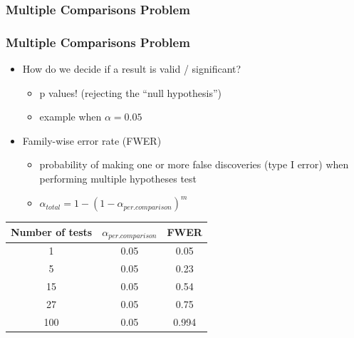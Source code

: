 \documentclass{beamer}
\begin{document}
		\subsubsection*{Multiple Comparisons Problem}
			\begin{frame}
				\frametitle{Multiple Comparisons Problem}
					\begin{itemize}
						\item How do we decide if a result is valid / significant?
							\begin{itemize}
								\item p values! (rejecting the ``null hypothesis'')
								\item example when $\alpha = 0.05$
								\pause
							\end{itemize}
						\end{itemize}
							\begin{itemize}
								\item Family-wise error rate (FWER)
									\begin{itemize}
										\item probability of making one or more false discoveries (type I error) when performing multiple hypotheses test
										\item $\alpha_{total} = 1 - (1 - \alpha_{per.comparison})^m$
										\pause
									\end{itemize}
							\end{itemize}
				\begin{center}
					\begin{tabular}{| c | c | c |}
						\hline
						\textbf{Number of tests } & \textbf{$\alpha_{per.comparison}$} & \textbf{FWER} \\
						\hline
						1 & 0.05 & 0.05 \\
						\hline
						5 & 0.05 &  0.23 \\
						\hline
						15 & 0.05 &  0.54 \\
						\hline
						27 & 0.05 &  0.75 \\
						\hline
						100 & 0.05 & 0.994\\
						\hline
					\end{tabular}
				\end{center}
			\end{frame}
\end{document}
